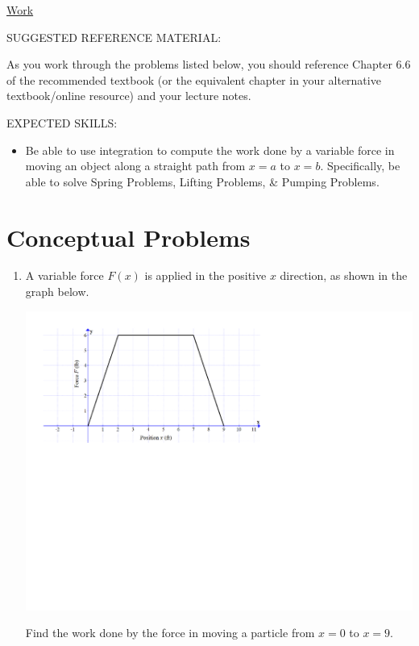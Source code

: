 \documentclass[12pt]{article}
\newif\ifans
\begin{document}
\begin{center}
\underline{\LARGE{Work}}
\end{center}

\bigskip

\noindent SUGGESTED REFERENCE MATERIAL:

\bigskip

\noindent As you work through the problems listed below, you should reference Chapter 6.6 of the recommended textbook (or the equivalent chapter in your alternative textbook/online resource) and your lecture notes.

\bigskip

\noindent EXPECTED SKILLS:

\begin{itemize}

\item Be able to use integration to compute the work done by a variable force in moving an object along a straight path from $x=a$ to $x=b$.  Specifically, be able to solve Spring Problems, Lifting Problems, \& Pumping Problems.

\end{itemize}

\section*{Conceptual Problems}

\begin{enumerate}

\item A variable force $F(x)$ is applied in the positive $x$ direction, as shown in the graph below.

\begin{center}
\includegraphics[scale=0.6]{graph1.pdf}
\end{center}

Find the work done by the force in moving a particle from $x=0$ to $x=9$.

\ifans{\fbox{42 ft$\cdot$lb}} \fi

\end{enumerate}
\end{document}
